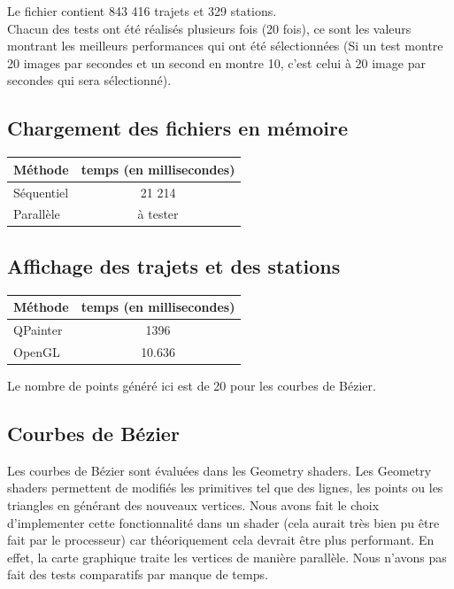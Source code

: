\documentclass[12pt]{article}
\begin{document}
		Le fichier contient 843 416 trajets et 329 stations. \\
		
		Chacun des tests ont été réalisés plusieurs fois (20 fois), ce
		sont les valeurs montrant les meilleurs performances qui ont été
		sélectionnées (Si un test montre 20 images par secondes et un second en montre
		10, c'est celui à 20 image par secondes qui sera sélectionné).
	    
		\subsection{Chargement des fichiers en mémoire}		
		\begin{center}
			\begin{tabular}{| l | c |}
			\hline
			\textbf{Méthode} & \textbf{temps (en millisecondes)} \\ \hline
			Séquentiel & 21 214 \\ \hline
			Parallèle & à tester \\ \hline
		    \end{tabular}
	    \end{center}
		
		\subsection{Affichage des trajets et des stations}
		\begin{center}
			\begin{tabular}{| l | c |}
			\hline
			\textbf{Méthode} & \textbf{temps (en millisecondes)} \\ \hline
			QPainter & 1396 \\ \hline
			OpenGL & 10.636 \\ \hline
		    \end{tabular}
	    \end{center}
	    
	    Le nombre de points généré ici est de 20 pour les courbes de Bézier.\\
	    	    
	    \subsection{Courbes de Bézier}
		Les courbes de Bézier sont évaluées dans les Geometry shaders. Les Geometry shaders
		permettent de modifiés les primitives tel que des lignes, les points ou les triangles
		en générant des nouveaux vertices. Nous avons fait le choix d'implementer cette 
		fonctionnalité dans un shader (cela aurait très bien pu être fait par le processeur)
		car théoriquement cela devrait être plus performant. En effet, la carte graphique
		traite les vertices de manière parallèle. Nous n'avons pas fait des tests
		comparatifs par manque de temps.\\
	    
\end{document}
